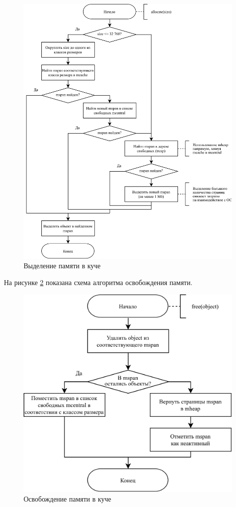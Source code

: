 \begin{figure}[H]
	\centering
	\includegraphics[scale=0.175]{assets/golang-allocate.png}
	\caption{Выделение памяти в куче}
	\label{fig:golang-allocate}
\end{figure}

На рисунке \ref{fig:golang-sweep} показана схема алгоритма освобождения памяти.

\begin{figure}[H]
	\centering
	\includegraphics[scale=0.175]{assets/golang-sweep.png}
	\caption{Освобождение памяти в куче}
	\label{fig:golang-sweep}
\end{figure}



